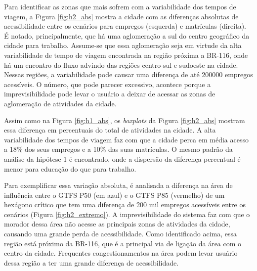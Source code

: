 \documentclass[        
    a4paper,          %
    12pt,             %
    chapter=TITLE,    %
    section=Title,    %
    subsection=Title, %
    oneside,          %
    english,          %
    spanish,          %
    brazil,           %
    fleqn             %
]{abntex2}
\begin{document}
  Para identificar as zonas que mais sofrem com a variabilidade dos tempos de viagem, a Figura \ref{fig:h2_abs} mostra a cidade com as diferenças absolutas de acessibilidade entre os cenários para empregos (esquerda) e matrículas (direita). É notado, principalmente, que há uma aglomeração a sul do centro geográfico da cidade para trabalho. Assume-se que essa aglomeração seja em virtude da alta variabilidade de tempo de viagem encontrada na região próxima a BR-116, onde há um encontro do fluxo advindo das regiões centro-sul e sudoeste na cidade. Nessas regiões, a variabilidade pode causar uma diferença de até 200000 empregos acessíveis. O número, que pode parecer excessivo, acontece porque a imprevisibilidade pode levar o usuário a deixar de acessar as zonas de aglomeração de atividades da cidade.
  
  \begin{figure}[!h]
  \captionsetup{width=16cm}
  \centering
  \end{figure}
  
  Assim como na Figura \ref{fig:h1_abs}, os \emph{boxplots} da Figura \ref{fig:h2_abs} mostram essa diferença em percentuais do total de atividades na cidade. A alta variabilidade dos tempos de viagem faz com que a cidade perca em média acesso a 18\% dos seus empregos e a 10\% das suas matrículas. O mesmo padrão da análise da hipótese 1 é encontrado, onde a dispersão da diferença percentual é menor para educação do que para trabalho.
  
  Para exemplificar essa variação absoluta, é analisada a diferença na área de influência entre o GTFS P50 (em azul) e o GTFS P85 (vermelho) de um hexágono crítico que tem uma diferença de 200 mil empregos acessíveis entre os cenários (Figura \ref{fig:h2_extremo}). A imprevisibilidade do sistema faz com que o morador dessa área não acesse as principais zonas de atividades da cidade, causando uma grande perda de acessibilidade. Como identificado acima, essa região está próximo da BR-116, que é a principal via de ligação da área com o centro da cidade. Frequentes congestionamentos na área podem levar usuário dessa região a ter uma grande diferença de acessibilidade.
  
\end{document}
